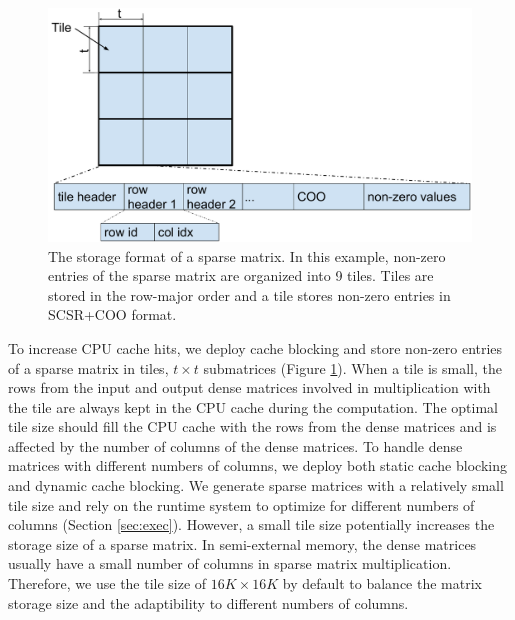 \begin{figure}
\centering
\includegraphics[scale=0.3]{SpMM_figs/sparse_mat.pdf}
\caption{The storage format of a sparse matrix. In this example, non-zero
entries of the sparse matrix are organized into 9 tiles. Tiles are stored in
the row-major order and a tile stores non-zero entries in SCSR+COO format.}
\label{sparse_mat}
\end{figure}

To increase CPU cache hits, we deploy cache blocking \cite{Im04} and store
non-zero entries of a sparse matrix in tiles, $t \times t$ submatrices (Figure
\ref{sparse_mat}).
When a tile is small, the rows from the input and output dense matrices
involved in multiplication with the tile are always kept in the CPU cache
during the computation. The optimal tile size should fill the CPU cache
with the rows from the dense matrices and is affected by the number of columns
of the dense matrices. To handle dense matrices with different numbers
of columns, we deploy both static cache blocking and dynamic cache blocking.
We generate sparse matrices with a relatively small tile size and
rely on the runtime system
to optimize for different numbers of columns (Section \ref{sec:exec}).
However, a small tile size potentially increases the storage size of a sparse
matrix. In semi-external memory, the dense matrices usually have
a small number of columns in sparse matrix multiplication. Therefore, we
use the tile size of $16K \times 16K$ by default to balance the matrix storage
size and the adaptibility to different numbers of columns.


